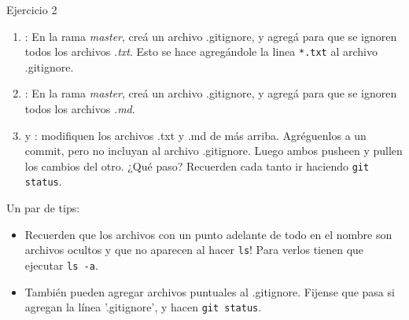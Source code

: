\begin{frame}[t]{}
    \small
    \begin{ejercicio}{Ejercicio 2}
    \begin{enumerate}
        \item {}: En la rama \textit{master}, creá un archivo .gitignore, y agregá para que se ignoren todos los archivos \textit{.txt}. 
        Esto se hace agregándole la linea \texttt{*.txt} al archivo .gitignore.
        \item {}: En la rama \textit{master}, creá un archivo .gitignore, y agregá para que se ignoren todos los archivos \textit{.md}. 
        \item {} y : modifiquen los archivos .txt y .md de más arriba. Agréguenlos a un commit, pero no incluyan al archivo .gitignore. Luego ambos pusheen y pullen los cambios del otro.
        ¿Qué paso? Recuerden cada tanto ir haciendo \texttt{git status}.
    \end{enumerate}
    \end{ejercicio}
    \small
    \begin{resumen}{Un par de tips:}
        \begin{itemize}
            \item Recuerden que los archivos con un punto adelante de todo en el nombre son archivos ocultos y que no aparecen al hacer \texttt{ls}! Para verlos tienen que ejecutar \texttt{ls -a}.
            \item También pueden agregar archivos puntuales al .gitignore. Fijense que pasa si agregan la línea '.gitignore', y hacen \texttt{git status}.
        \end{itemize}
    \end{resumen}
\end{frame}

